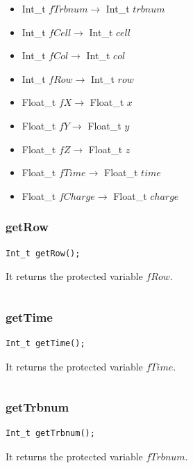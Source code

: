 \documentclass[a4paper]{book}
\begin{document}
\begin{itemize}
	\item Int\_t $fTrbnum \rightarrow$ Int\_t $trbnum$
	\item Int\_t $fCell \rightarrow$ Int\_t $cell$
	\item Int\_t $fCol \rightarrow$ Int\_t $col$
	\item Int\_t $fRow \rightarrow$ Int\_t $row$
	\item Float\_t $fX \rightarrow$ Float\_t $x$
	\item Float\_t $fY \rightarrow$ Float\_t $y$
	\item Float\_t $fZ \rightarrow$ Float\_t $z$
	\item Float\_t $fTime \rightarrow$ Float\_t $time$
	\item Float\_t $fCharge \rightarrow$ Float\_t $charge$
\end{itemize}



\subsubsection{getRow}

\begin{lstlisting}[style=customc]
Int_t getRow();
\end{lstlisting}

It returns the protected variable $fRow$.

\[\]

\subsubsection{getTime}

\begin{lstlisting}[style=customc]
Int_t getTime();
\end{lstlisting}

It returns the protected variable $fTime$.

\[\]

\subsubsection{getTrbnum}

\begin{lstlisting}[style=customc]
Int_t getTrbnum();
\end{lstlisting}

It returns the protected variable $fTrbnum$.

\[\]
\end{document}
